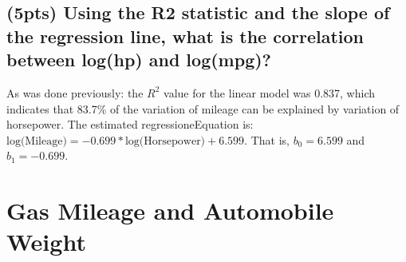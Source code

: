 \documentclass{article}\usepackage[]{graphicx}\usepackage[]{color}
\begin{document}
\subsection{(5pts) Using the R2 statistic and the slope of the regression line, what is the correlation between
log(hp) and log(mpg)?}
As was done previously:
the $R^2$ value for the linear model was 0.837, which indicates that 83.7\% of the variation of mileage can be explained by variation of horsepower.
The estimated regressioneEquation is:  $\text{log(Mileage)} = -0.699 * \text{log(Horsepower)} + 6.599$.  That is, $b_0 = 6.599$ and $b_1 = -0.699$.

\section{Gas Mileage and Automobile Weight}
\subsection{}
\end{document}
